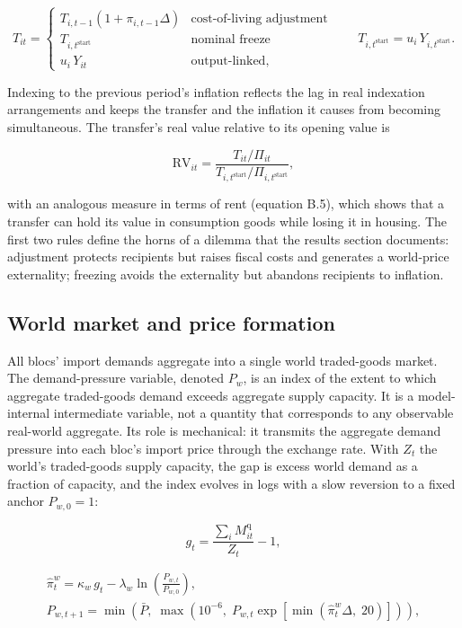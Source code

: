 \documentclass[preprint,review,12pt]{elsarticle}
\begin{document}
\[T_{it} = \begin{cases} T_{i,t-1} \left( 1 + \pi_{i,t-1} \Delta \right) & \text{cost-of-living adjustment} \\ T_{i,t^{\mathrm{start}}} & \text{nominal freeze} \\ u_i \, Y_{it} & \text{output-linked,} \end{cases} \qquad T_{i,t^{\mathrm{start}}} = u_i \, Y_{i,t^{\mathrm{start}}}. \tag{22}\]

Indexing to the previous period's inflation reflects the lag in real
indexation arrangements and keeps the transfer and the inflation it
causes from becoming simultaneous. The transfer's real value relative to
its opening value is

\[\mathrm{RV}_{it} = \frac{T_{it} / \Pi_{it}}{T_{i,t^{\mathrm{start}}} / \Pi_{i,t^{\mathrm{start}}}}, \tag{23}\]

with an analogous measure in terms of rent (equation B.5), which shows
that a transfer can hold its value in consumption goods while losing it
in housing. The first two rules define the horns of a dilemma that the
results section documents: adjustment protects recipients but raises
fiscal costs and generates a world-price externality; freezing avoids
the externality but abandons recipients to inflation.

\subsection{World market and price formation}

All blocs' import demands aggregate into a single world traded-goods
market. The demand-pressure variable, denoted \(P_w\), is an index of
the extent to which aggregate traded-goods demand exceeds aggregate
supply capacity. It is a model-internal intermediate variable, not a
quantity that corresponds to any observable real-world aggregate. Its
role is mechanical: it transmits the aggregate demand pressure into each
bloc's import price through the exchange rate. With \(Z_t\) the world's
traded-goods supply capacity, the gap is excess world demand as a
fraction of capacity, and the index evolves in logs with a slow
reversion to a fixed anchor \(P_{w,0} = 1\):

\[g_t = \frac{\sum_i M^{\mathrm{q}}_{it}}{Z_t} - 1, \tag{24}\]

\[\begin{gathered} \hat{\pi}^w_t = \kappa_w \, g_t - \lambda_w \ln\left( \frac{P_{w,t}}{P_{w,0}} \right), \\ P_{w,t+1} = \min\left( \bar{P},\; \max\left( 10^{-6},\; P_{w,t} \exp\left[ \min\left( \hat{\pi}^w_t \Delta,\; 20 \right) \right] \right) \right), \end{gathered} \tag{25}\]
\end{document}
